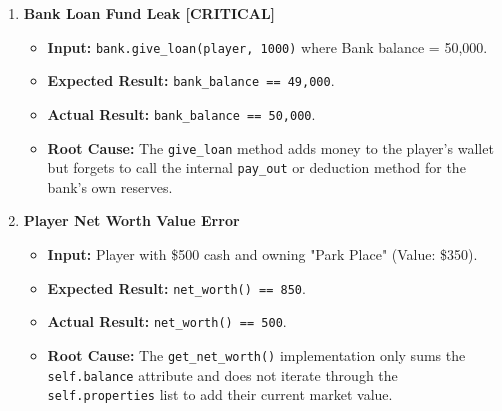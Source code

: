 \documentclass{article}
\begin{document}
\begin{enumerate}
    \item \textbf{Bank Loan Fund Leak [CRITICAL]}
    \begin{itemize}
        \item \textbf{Input:} \texttt{bank.give_loan(player, 1000)} where Bank balance = 50,000.
        \item \textbf{Expected Result:} \texttt{bank_balance == 49,000}.
        \item \textbf{Actual Result:} \texttt{bank_balance == 50,000}.
        \item \textbf{Root Cause:} The \texttt{give_loan} method adds money to the player's wallet but forgets to call the internal \texttt{pay_out} or deduction method for the bank's own reserves.
    \end{itemize}

    \item \textbf{Player Net Worth Value Error}
    \begin{itemize}
        \item \textbf{Input:} Player with \$500 cash and owning "Park Place" (Value: \$350).
        \item \textbf{Expected Result:} \texttt{net_worth() == 850}.
        \item \textbf{Actual Result:} \texttt{net_worth() == 500}.
        \item \textbf{Root Cause:} The \texttt{get_net_worth()} implementation only sums the \texttt{self.balance} attribute and does not iterate through the \texttt{self.properties} list to add their current market value.
    \end{itemize}
\end{enumerate}
\end{document}
